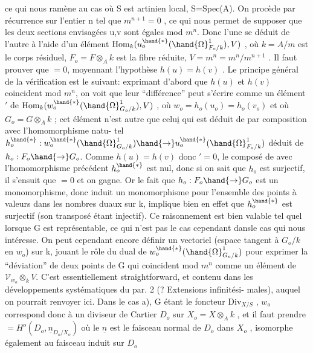 
ce qui nous ramène au cas où S est artinien local, S=Spec(A). On procède
par récurrence sur l'entier n tel que $m^{n+1}=0$ , ce qui nous permet de
supposer que les deux sections envisagées u,v sont égales mod $m^{n}$. Donc
l'une se déduit de l'autre à l'aide d'un élément  
$\mathrm{Hom}_k(u_o^{\hand{*}}(\hand{\Omega}^1_{F_o/k}), V)$ , où $k=A/m$ est le corps résiduel, $F_o=F\otimes_A k$ est la
fibre réduite, $V=m^n = m^n/m^{n+1}$ . Il faut prouver que \hand{$\delta$}$= 0$, moyennant
l'hypothèse $h(u)=h(v)$ . Le principe général de la vérification est le
suivant: exprimant d'abord que $h(u)$ et $h(v)$ coincident mod $m^n$, on voit
que leur ``différence'' peut s'écrire comme un élément \hand{$\delta$}$'$ de
$\mathrm{Hom}_k(w_o^{\hand{*}}(\hand{\Omega}^1_{G_o/k}),V)$ , où $w_o = h_o(u_o)=h_o(v_o)$  et où $G_o = G\otimes_A k$ ;
cet élément n'est autre que celu\uline{i} qui est déduit de \hand{$\delta$} par composition avec l'homomorphisme natu-%
tel $h_o^{\hand{*}} : w_o^{\hand{*}}(\hand{\Omega}^1_{G_o/k}) \hand{\to} u_o^{\hand{*}}(\hand{\Omega}^1_{F_o/k})$ déduit de $h_o: F_o\hand{\to} G_o$. Comme
$h(u)=h(v)$ donc \hand{$\delta$}$' = 0$, le composé de \hand{$\delta$} avec l'homomorphisme précédent
$h_o^{\hand{*}}$ est nul, donc si on sait que $h_o$ est surjectif, il s'ensuit que \hand{$\delta$}$=0$
et on gagne. Or le fait que $h_o:F_o\hand{\to} G_o$ est un monomorphisme, donc induit
un monomorphisme pour l'ensemble des points à valeurs dans les nombres
duaux sur k, implique bien en effet que $h_o^{\hand{*}}$ est surjectif (son transposé
étant injectif). Ce raisonnement est bien valable tel quel lorsque G
est représentable, ce qui n'est pas le cas cependant dansle cas qui nous
intéresse.  On peut cependant encore définir un vectoriel  (espace tangent à $G_o/k$ en $w_o$) sur k, jouant le rôle
du dual de $w_o^{\hand{*}}(\hand{\Omega}^1_{G_o/k})$ pour exprimer la ``déviation'' de deux points de G qui
coincident mod $m^n$ comme un élément de $\mathcal{V}_{w_o}\otimes_k V$. C'est essentiellement straightforward, et contenu
dans les développements systématiques du par. 2 (? Extensions infinitési-%
males), auquel on pourrait renvoyer ici. Dans le cas a), G étant le
foncteur $\mathrm{Div}_{X/S}$ , $w_o$ correspond donc à un diviseur de Cartier  $D_o$ sur
$X_o = X\otimes_A k$ , et il faut prendre \hand{$\Omega$}$= H^o(D_o, \underline{n}_{D_o/X_o})$ où le $\underline{n}$ est le
faisceau normal de $D_o$ dans $X_o$ , isomorphe également au faisceau induit
sur $D_o$

